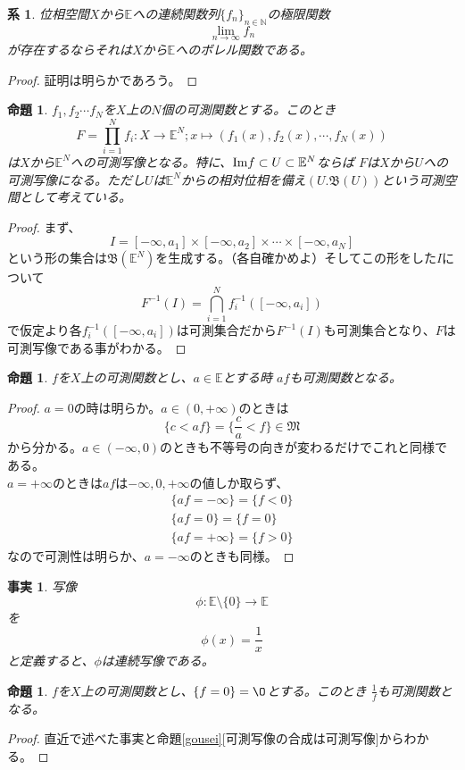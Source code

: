 \documentclass[leqno]{jsarticle}
\newtheorem{prop}[thm]{命題}
\newtheorem{cor}[thm]{系}
\newtheorem{fact}[thm]{事実}
\newcommand{\nn}{\mathbb{N}}
\newcommand{\mgn}{\infty}
\newcommand{\dpst}{\displaystyle}
\newcommand{\mm}{\mathfrak{M}}
\newcommand{\ffnn}{\{f_{n}\}_{n\in \nn}}
\newcommand{\rrr}{\mathbb{E}}
\begin{document}
\begin{cor}\label{borel}
位相空間$X$から$\rrr$への連続関数列$\ffnn$の極限関数
\[
\lim_{n\to \mgn}f_{n}
\]
が存在するならそれは$X$から$\rrr$へのボレル関数である。
\end{cor}
\begin{proof}
証明は明らかであろう。
\end{proof}


\begin{prop}\label{oisii}$f_1,f_2\cdots f_N$を$X$上の$N$個の可測関数とする。このとき
\[
F=\prod_{i=1}^Nf_i:X\to \rrr^{N};x\mapsto(f_1(x),f_2(x),\cdots ,f_N(x))
\]
は$X$から$\rrr^N$への可測写像となる。特に、${\rm Im}f\subset U\subset \rrr^N$ならば
$F$は$X$から$U$への可測写像になる。ただし$U$は$\rrr^N$からの相対位相を備え$(U.\mathfrak{B}(U))$という可測空間として考えている。
\end{prop}
\begin{proof}
まず、
\[
I=[-\mgn,a_1]\times [-\mgn,a_2]\times \cdots \times [-\mgn,a_N]
\]
という形の集合は$\mathfrak{B}(\rrr^N)$を生成する。（各自確かめよ）そしてこの形をした$I$について
\[
F^{-1}(I)=\bigcap_{i=1}^Nf_i^{-1}([-\mgn,a_i])
\]
で仮定より各$\dpst f_i^{-1}([-\mgn,a_i])$は可測集合だから$F^{-1}(I)$も可測集合となり、$F$は可測写像である事がわかる。
\end{proof}


\begin{prop}$f$を$X$上の可測関数とし、$a\in \rrr$とする時
$af$も可測関数となる。
\end{prop}
\begin{proof}$a=0$の時は明らか。$a\in (0,+\mgn)$のときは
\[
\{c<af\}=\{\frac{c}{a}<f\}\in\mm
\]
から分かる。$a\in(-\mgn,0)$のときも不等号の向きが変わるだけでこれと同様である。\\ 
$a=+\mgn$のときは$af$は$-\mgn,0,+\mgn$の値しか取らず、
\begin{eqnarray*}
\{af=-\mgn\}=\{f<0\}\\ 
\{af=0\}=\{f=0\}\\ 
\{af=+\mgn\}=\{f>0\}
\end{eqnarray*}
なので可測性は明らか、$a=-\mgn$のときも同様。
\end{proof}

\begin{fact}写像
\[
\phi:\rrr\setminus \{0\}\to \rrr
\]
を
\[
\phi(x)=\frac{1}{x}
\]
と定義すると、$\phi$は連続写像である。
\end{fact}

\begin{prop}$f$を$X$上の可測関数とし、$\{f=0\}=\O$とする。このとき
$\dpst \frac{1}{f}$も可測関数となる。
\end{prop}
\begin{proof}
直近で述べた事実と命題\ref{gousei}[可測写像の合成は可測写像]からわかる。
\end{proof}
\end{document}
